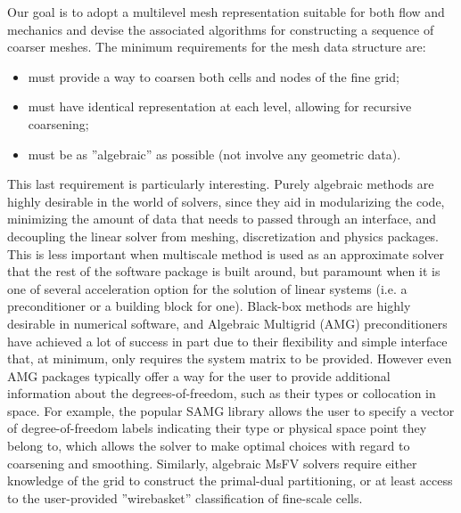 Our goal is to adopt a multilevel mesh representation suitable for both flow and mechanics and devise the associated algorithms for constructing a sequence of coarser meshes.   The minimum requirements for the mesh data structure are:
\begin{itemize}
    \item must provide a way to coarsen both cells and nodes of the fine grid;
    \item must have identical representation at each level, allowing for recursive coarsening;
    \item must be as ''algebraic'' as possible (not involve any geometric data).
\end{itemize}
This last requirement is particularly interesting.   Purely algebraic methods are highly desirable in the world of solvers, since they aid in modularizing the code, minimizing the amount of data that needs to passed through an interface, and decoupling the linear solver from meshing, discretization and physics packages.   This is less important when multiscale method is used as an approximate solver that the rest of the software package is built around, but paramount when it is one of several acceleration option for the solution of linear systems (i.e. a preconditioner or a building block for one).   Black-box methods are highly desirable in numerical software, and Algebraic Multigrid (AMG) preconditioners have achieved a lot of success in part due to their flexibility and simple interface that, at minimum, only requires the system matrix to be provided.   However even AMG packages typically offer a way for the user to provide additional information about the degrees-of-freedom, such as their types or collocation in space. For example, the popular SAMG library allows the user to specify a vector of degree-of-freedom labels indicating their type or physical space point they belong to, which allows the solver to make optimal choices with regard to coarsening and smoothing.   Similarly, algebraic MsFV solvers require either knowledge of the grid to construct the primal-dual partitioning, or at least access to the user-provided ''wirebasket'' classification of fine-scale cells.

